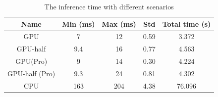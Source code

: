 \documentclass[12pt,a4paper]{article}
\begin{document}
\begin{table}[H]
    \caption{The inference time with different scenarios}
    \label{tab: Data}
    \centering
    \begin{tabular}{c|c|c|c|c}
    \toprule
     \textbf{Name} &\bf{Min (ms)}& \bf{Max (ms)} & \textbf{Std} & \textbf{Total time (s)} \\
     \midrule
     GPU & 7 & 12 & 0.59 & 3.372\\
     GPU-half & 9.4 & 16 & 0.77 & 4.563 \\
     GPU(Pro) & 9 & 14 & 0.30 & 4.224\\
     GPU-half (Pro) & 9.3 & 24 & 0.81 & 4.302 \\
     CPU & 163 & 204 & 4.38 & 76.096  \\
     \bottomrule
    \end{tabular}
\end{table}







\end{document}
